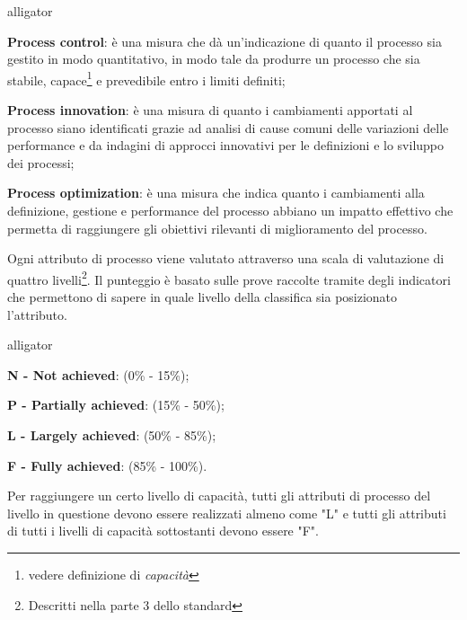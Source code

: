 \begin{labeling}{alligator}
	\item \textbf{Process control}:  è una misura che dà un'indicazione di quanto il processo sia gestito in modo quantitativo, in modo tale da produrre un processo che sia stabile, capace\footnote{vedere definizione di \emph{capacità}} e prevedibile entro i limiti definiti;%
	\item \textbf{Process innovation}: è una misura di quanto i cambiamenti apportati al processo siano identificati grazie ad analisi di cause comuni delle variazioni delle performance e da indagini di approcci innovativi per le definizioni e lo sviluppo dei processi;%
	\item \textbf{Process optimization}: è una misura che indica quanto i cambiamenti alla definizione, gestione e performance del processo abbiano un impatto effettivo che permetta di raggiungere gli obiettivi rilevanti di miglioramento del processo.%
\end{labeling}

Ogni attributo di processo viene valutato attraverso una scala di valutazione di quattro livelli\footnote{Descritti nella parte 3 dello standard}. Il punteggio è basato sulle prove raccolte tramite degli indicatori che permettono di sapere in quale livello della classifica sia posizionato l'attributo. 
\begin{labeling}{alligator}
	\item \textbf{N - Not achieved}: (0\% - 15\%);
	\item \textbf{P - Partially achieved}: (15\% - 50\%);
	\item \textbf{L - Largely achieved}: (50\% - 85\%);
	\item \textbf{F - Fully achieved}: (85\% - 100\%).
\end{labeling}

Per raggiungere un certo livello di capacità, tutti gli attributi di processo del livello in questione devono essere realizzati almeno come "L" e tutti gli attributi di tutti i livelli di capacità sottostanti devono essere "F".

